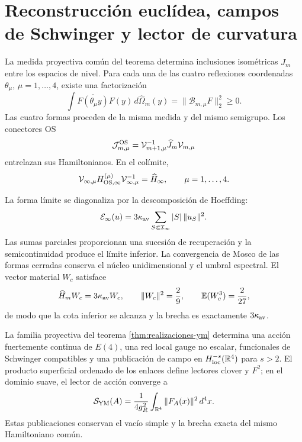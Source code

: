 \section*{Reconstrucción euclídea, campos de Schwinger y lector de curvatura}

La medida proyectiva común del teorema determina inclusiones isométricas
\(\widehat J_m\) entre los espacios de nivel. Para cada una de las cuatro
reflexiones coordenadas \(\theta_\mu\), \(\mu=1,\ldots,4\), existe una
factorización
\begin{equation}\label{eq:amp-ym-cuatro-os}
 \int\overline{F(\theta_\mu y)}F(y)\,
 d\widehat\Omega_m(y)
 =\|\mathcal B_{m,\mu}F\|_2^2\geq0.
\end{equation}
Las cuatro formas proceden de la misma medida y del mismo semigrupo. Los
conectores OS
\[
 \mathcal J_{m,\mu}^{\rm OS}
 =\mathcal V_{m+1,\mu}^{-1}\widehat J_m\mathcal V_{m,\mu}
\]
entrelazan sus Hamiltonianos. En el colímite,
\begin{equation}\label{eq:amp-ym-hamiltoniano-comun}
 \mathcal V_{\infty,\mu}H_{{\rm OS},\infty}^{(\mu)}
 \mathcal V_{\infty,\mu}^{-1}
 =\widehat H_\infty,
 \qquad \mu=1,\ldots,4.
\end{equation}

La forma límite se diagonaliza por la descomposición de Hoeffding:
\begin{equation}\label{eq:amp-ym-forma-limite}
 \mathcal E_\infty(u)=3\kappa_{\rm av}
 \sum_{S\Subset\mathcal I_\infty}|S|\,\|u_S\|^2.
\end{equation}
Las sumas parciales proporcionan una sucesión de recuperación y la
semicontinuidad produce el límite inferior. La convergencia de Mosco de las
formas cerradas conserva el núcleo unidimensional y el umbral espectral. El
vector material \(W_c\) satisface
\begin{equation}\label{eq:amp-ym-testigo-gap}
 \widehat H_mW_c=3\kappa_{\rm av}W_c,
 \qquad \|W_c\|^2=\frac29,
 \qquad \mathbb E(W_c^3)=\frac2{27},
\end{equation}
de modo que la cota inferior se alcanza y la brecha es exactamente
\(3\kappa_{\rm av}\).

\begin{theorem}
\label{thm:amp-ym-terminacion}
La familia proyectiva del teorema \ref{thm:realizaciones-ym} determina una
acción fuertemente continua de \(E(4)\), una red local gauge no escalar,
funcionales de Schwinger compatibles y una publicación de campo en
\(H^{-s}_{\rm loc}(\mathbb R^4)\) para \(s>2\). El producto superficial
ordenado de los enlaces define lectores clover y \(F^2\); en el dominio
suave, el lector de acción converge a
\begin{equation}\label{eq:amp-ym-f2}
 \mathcal S_{\rm YM}(A)
 =\frac1{4g_R^2}\int_{\mathbb R^4}\|F_A(x)\|^2\,d^4x.
\end{equation}
Estas publicaciones conservan el vacío simple y la brecha exacta del mismo
Hamiltoniano común.
\end{theorem}

